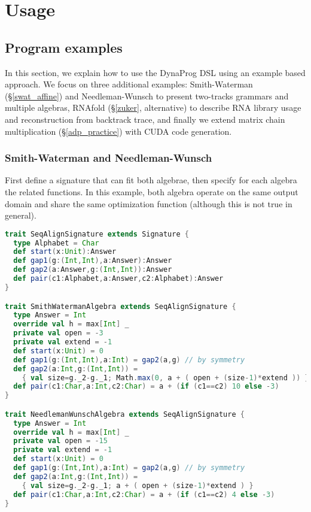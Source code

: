 \newpage
\section{Usage} \label{usage}
\subsection{Program examples}
In this section, we explain how to use the DynaProg DSL using an example based approach. We focus on three additional examples: Smith-Waterman (\S\ref{swat_affine}) and Needleman-Wunsch to present two-tracks grammars and multiple algebras, RNAfold\cite{gpu_rnafold} (\S\ref{zuker}, alternative) to describe RNA library usage and reconstruction from backtrack trace, and finally we extend matrix chain multiplication (\S\ref{adp_practice}) with CUDA code generation.

\subsubsection{Smith-Waterman and Needleman-Wunsch} \label{ex_swat}
First define a signature that can fit both algebrae, then specify for each algebra the related functions. In this example, both algebra operate on the same output domain and share the same optimization function (although this is not true in general).
\begin{lstlisting}[language=Scala,captionpos=none]
trait SeqAlignSignature extends Signature {
  type Alphabet = Char
  def start(x:Unit):Answer
  def gap1(g:(Int,Int),a:Answer):Answer
  def gap2(a:Answer,g:(Int,Int)):Answer
  def pair(c1:Alphabet,a:Answer,c2:Alphabet):Answer
}

trait SmithWatermanAlgebra extends SeqAlignSignature {
  type Answer = Int
  override val h = max[Int] _
  private val open = -3
  private val extend = -1
  def start(x:Unit) = 0
  def gap1(g:(Int,Int),a:Int) = gap2(a,g) // by symmetry
  def gap2(a:Int,g:(Int,Int)) =
    { val size=g._2-g._1; Math.max(0, a + ( open + (size-1)*extend )) }
  def pair(c1:Char,a:Int,c2:Char) = a + (if (c1==c2) 10 else -3)
}

trait NeedlemanWunschAlgebra extends SeqAlignSignature {
  type Answer = Int
  override val h = max[Int] _
  private val open = -15
  private val extend = -1
  def start(x:Unit) = 0
  def gap1(g:(Int,Int),a:Int) = gap2(a,g) // by symmetry
  def gap2(a:Int,g:(Int,Int)) =
    { val size=g._2-g._1; a + ( open + (size-1)*extend ) }
  def pair(c1:Char,a:Int,c2:Char) = a + (if (c1==c2) 4 else -3)
}
\end{lstlisting}

